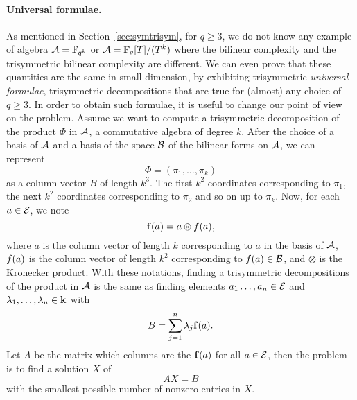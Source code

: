 \documentclass[11pt]{article}
\begin{document}
\paragraph{Universal formulae.}
As mentioned in Section~\ref{sec:symtrisym}, for $q\geq3$, we do not know any example of
algebra $\mathcal{A}=\mathbb{F}_{q^k}$ or $\mathcal{A}=\mathbb{F}_{q}[T]/(T^k)$ where the bilinear complexity and
the trisymmetric bilinear complexity are different. We can even prove that these
quantities are the same in small dimension, by exhibiting trisymmetric \emph{universal
formulae}, \ie trisymmetric decompositions that are true for (almost) any choice
of $q\geq3$. In order to obtain such formulae, it is useful to
change our point of view on the problem. Assume we want to compute a
trisymmetric decomposition of the product $\Phi$ in $\mathcal{A}$, a commutative algebra
of degree $k$. After the choice of a basis of $\mathcal{A}$ and a basis of the space $\mathcal{B}$
of the bilinear forms on $\mathcal{A}$, we can represent
\[
  \Phi=(\pi_1, \dots, \pi_k)
\]
as a column vector $B$ of length $k^3$. The first $k^2$ coordinates corresponding
to $\pi_1$, the next $k^2$ coordinates corresponding to $\pi_2$ and so on up to
$\pi_k$. Now, for each $a\in\mathcal{E}$, we note
\[
  \mathbf{f}(a) = a\otimes f(a),
\] 
where $a$ is the column vector of length $k$ corresponding to $a$ in the basis
of $\mathcal{A}$, $f(a)$ is the column vector of length $k^2$ corresponding
to $f(a)\in\mathcal{B}$, and $\otimes$ is the Kronecker product. With these notations,
finding a trisymmetric decompositions of the product in
$\mathcal{A}$ is the same as finding elements $a_1\dots,
a_n\in\mathcal{E}$ and $\lambda_1, \dots, \lambda_n\in\mathbf{k}$ with
\[
  B = \sum_{j=1}^n \lambda_j\mathbf{f}(a).
\]
Let $A$ be the matrix which columns are the $\mathbf{f}(a)$ for all $a\in\mathcal{E}$, then the
problem is to find a solution $X$ of
\[
  AX = B
\]
with the smallest possible number of nonzero entries in $X$.
\end{document}

